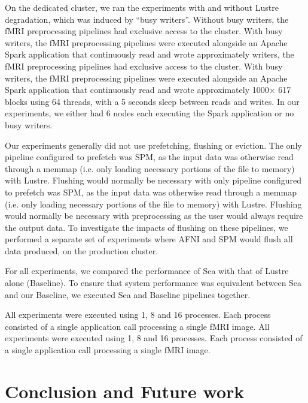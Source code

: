 \documentclass[fleqn,10pt]{wlscirep}
\begin{document}
    On the dedicated cluster, we ran the experiments with and without
    Lustre degradation, which was induced by ``busy writers''. Without busy
    writers, the fMRI preprocessing pipelines had exclusive access to the
    cluster. With busy writers, the fMRI preprocessing pipelines were executed
    alongside an Apache Spark application that continuously read and wrote approximately
    writers, the fMRI preprocessing pipelines had exclusive access to the
    cluster. With busy writers, the fMRI preprocessing pipelines were executed
    alongside an Apache Spark application that continuously read and wrote approximately
    1000$\times$ \SI{617}{\mebi\byte} blocks using 64 threads, with a 5 seconds sleep between reads
    and writes. In our experiments, we either had 6 nodes each executing the
    Spark application or no busy writers.

    Our experiments generally did not use prefetching, flushing or eviction. The
    only pipeline configured to prefetch was SPM, as the input data was otherwise
    read through a memmap (i.e. only loading necessary portions of the file to memory) 
    with Lustre. Flushing would normally be necessary with
    only pipeline configured to prefetch was SPM, as the input data was otherwise
    read through a memmap (i.e. only loading necessary portions of the file to memory) 
    with Lustre. Flushing would normally be necessary with
    preprocessing as the user would always require the output data. To
    investigate the impacts of flushing on these pipelines, we performed a
    separate set of experiments where AFNI and SPM would flush all data
    produced, on the production cluster.

    For all experiments, we compared the performance of Sea with that of Lustre
    alone (Baseline). To ensure that system performance was equivalent between
    Sea and our Baseline, we executed Sea and Baseline pipelines together.
    
    All experiments were executed using 1, 8 and 16 processes.
    Each process consisted of a single application call processing a single fMRI image.
    All experiments were executed using 1, 8 and 16 processes.
    Each process consisted of a single application call processing a single fMRI image.
    
    \section{Conclusion and Future work}
\end{document}
